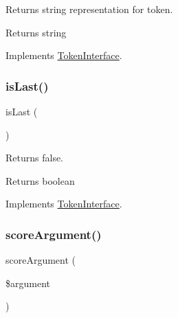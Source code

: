 Returns string representation for token.

\begin{DoxyReturn}{Returns}
string 
\end{DoxyReturn}


Implements \mbox{\hyperlink{interface_prophecy_1_1_argument_1_1_token_1_1_token_interface_a7516ca30af0db3cdbf9a7739b48ce91d}{Token\+Interface}}.

\mbox{\label{class_prophecy_1_1_argument_1_1_token_1_1_array_count_token_ac72b8349b1340887fc1af30eca2b951c}} 
\subsubsection{\texorpdfstring{is\+Last()}{isLast()}}
{\footnotesize\ttfamily is\+Last (\begin{DoxyParamCaption}{ }\end{DoxyParamCaption})}

Returns false.

\begin{DoxyReturn}{Returns}
boolean 
\end{DoxyReturn}


Implements \mbox{\hyperlink{interface_prophecy_1_1_argument_1_1_token_1_1_token_interface_ac72b8349b1340887fc1af30eca2b951c}{Token\+Interface}}.

\mbox{\label{class_prophecy_1_1_argument_1_1_token_1_1_array_count_token_a8d5bf47ab6eaa935458d5ad160e52822}} 
\subsubsection{\texorpdfstring{score\+Argument()}{scoreArgument()}}
{\footnotesize\ttfamily score\+Argument (\begin{DoxyParamCaption}\item[{}]{\$argument }\end{DoxyParamCaption})}

